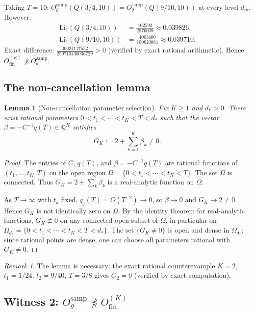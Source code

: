 \documentclass[12pt]{amsart}
\theoremstyle{definition}
\theoremstyle{remark}
\newtheorem{remark}[definition]{Remark}
\theoremstyle{plain}
\newtheorem{lemma}[definition]{Lemma}
\newcommand{\Li}{\mathrm{Li}}
\newcommand{\Ofinite}{O_{\mathrm{fin}}}
\newcommand{\Otheta}{O_{\theta}^{\mathrm{samp}}}
\newcommand{\QQ}{\mathbb{Q}}
\begin{document}
Taking $T = 10$: $\Otheta(Q(3/4, 10)) = \Otheta(Q(9/10, 10))$ at
every level $d_m$.  However:
\begin{align*}
  \Li_1(Q(3/4,10)) &= \frac{102592}{2576009} \approx 0.039826,\\
  \Li_1(Q(9/10,10)) &= \frac{4003600}{100820081} \approx 0.039710.
\end{align*}
Exact difference: $\frac{30024117552}{259713436036729} > 0$
(verified by exact rational arithmetic).
Hence $\Ofinite^{(K)} \npreceq \Otheta$.

\subsection{The non-cancellation lemma}

\begin{lemma}[Non-cancellation parameter selection]
\label{lem:noncancel}
Fix $K \geq 1$ and $d_* > 0$.  There exist rational parameters
$0 < t_1 < \cdots < t_K < T < d_*$ such that the vector
$\beta = -C^{-1}q(T) \in \QQ^K$ satisfies
\[
  G_K := 2 + \sum_{k=1}^K \beta_k \neq 0.
\]
\end{lemma}

\begin{proof}
The entries of $C$, $q(T)$, and $\beta = -C^{-1}q(T)$ are rational
functions of $(t_1,\ldots,t_K,T)$ on the open region
$\Omega = \{0 < t_1 < \cdots < t_K < T\}$.
The set $\Omega$ is connected.
Thus $G_K = 2 + \sum_k \beta_k$ is a real-analytic function on $\Omega$.

As $T \to \infty$ with $t_k$ fixed, $q_j(T) = O(T^{-2}) \to 0$,
so $\beta \to 0$ and $G_K \to 2 \neq 0$.  Hence $G_K$ is not identically
zero on $\Omega$.  By the identity theorem for real-analytic functions,
$G_K \not\equiv 0$ on any connected open subset of $\Omega$, in particular
on $\Omega_{d_*} = \{0 < t_1 < \cdots < t_K < T < d_*\}$.
The set $\{G_K \neq 0\}$ is open and dense in $\Omega_{d_*}$; since
rational points are dense, one can choose all parameters rational with
$G_K \neq 0$.
\end{proof}

\begin{remark}
The lemma is necessary: the exact rational counterexample $K=2$,
$t_1 = 1/24$, $t_2 = 9/40$, $T = 3/8$ gives $G_2 = 0$
(verified by exact computation).
\end{remark}

\subsection{Witness 2: \texorpdfstring{$\Otheta \npreceq \Ofinite^{(K)}$}{O-fin does not refine O-theta}}
\end{document}
